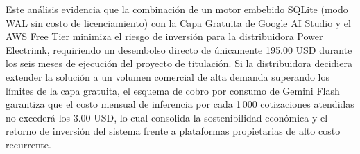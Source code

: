 Este análisis evidencia que la combinación de un motor embebido SQLite (modo WAL sin costo de licenciamiento) con la Capa Gratuita de Google AI Studio y el AWS Free Tier minimiza el riesgo de inversión para la distribuidora Power Electrimk, requiriendo un desembolso directo de únicamente 195.00 USD durante los seis meses de ejecución del proyecto de titulación. Si la distribuidora decidiera extender la solución a un volumen comercial de alta demanda superando los límites de la capa gratuita, el esquema de cobro por consumo de Gemini Flash garantiza que el costo mensual de inferencia por cada 1\,000 cotizaciones atendidas no excederá los 3.00 USD, lo cual consolida la sostenibilidad económica y el retorno de inversión del sistema frente a plataformas propietarias de alto costo recurrente.
